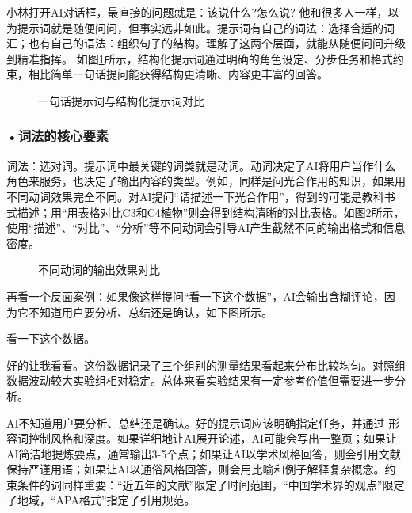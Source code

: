 小林打开AI对话框，最直接的问题就是：该说什么?怎么说?
他和很多人一样，以为提示词就是随便问问，但事实远非如此。提示词有自己的词法：选择合适的词汇；也有自己的语法：组织句子的结构。理解了这两个层面，就能从随便问问升级到精准指挥。 如图\ref{fig:ch3_3_1}所示，结构化提示词通过明确的角色设定、分步任务和格式约束，相比简单一句话提问能获得结构更清晰、内容更丰富的回答。

\begin{figure}[H]
\centering
{}
\caption{一句话提示词与结构化提示词对比}
\label{fig:ch3_3_1}
\end{figure}



\subsubsection*{\textbf{•词法的核心要素}}

词法：选对词。提示词中最关键的词类就是动词。动词决定了AI将用户当作什么角色来服务，也决定了输出内容的类型。例如，同样是问光合作用的知识，如果用不同动词效果完全不同。对AI提问“请描述一下光合作用”，得到的可能是教科书式描述；用“用表格对比C3和C4植物”则会得到结构清晰的对比表格。如图\ref{fig:ch3_3_2}所示，使用“描述”、“对比”、“分析”等不同动词会引导AI产生截然不同的输出格式和信息密度。

\begin{figure}[H]
\centering
{}
\caption{不同动词的输出效果对比}
\label{fig:ch3_3_2}
\end{figure}

再看一个反面案例：如果像这样提问“看一下这个数据”，AI会输出含糊评论，因为它不知道用户要分析、总结还是确认，如下图所示。\par \begin{userbox}
看一下这个数据。

\end{userbox}

\begin{aibox}
好的让我看看。这份数据记录了三个组别的测量结果看起来分布比较均匀。对照组数据波动较大实验组相对稳定。总体来看实验结果有一定参考价值但需要进一步分析。
\end{aibox}

AI不知道用户要分析、总结还是确认。好的提示词应该明确指定任务，并通过
形容词控制风格和深度。如果详细地让AI展开论述，AI可能会写出一整页；如果让AI简洁地提炼要点，通常输出3-5个点；如果让AI以学术风格回答，则会引用文献保持严谨用语；如果让AI以通俗风格回答，则会用比喻和例子解释复杂概念。约束条件的词同样重要：“近五年的文献”限定了时间范围，“中国学术界的观点”限定了地域，“APA格式”指定了引用规范。 

